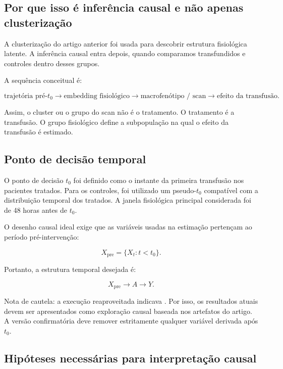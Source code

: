 \subsection{Por que isso é inferência causal e não apenas clusterização}

A clusterização do artigo anterior foi usada para descobrir estrutura fisiológica latente. A inferência causal entra depois, quando comparamos transfundidos e controles dentro desses grupos.

A sequência conceitual é:

\[
\text{trajetória pré-}t_0
\rightarrow
\text{embedding fisiológico}
\rightarrow
\text{macrofenótipo / scan}
\rightarrow
\text{efeito da transfusão}.
\]

Assim, o cluster ou o grupo do scan não é o tratamento. O tratamento é a transfusão. O grupo fisiológico define a subpopulação na qual o efeito da transfusão é estimado.

\subsection{Ponto de decisão temporal}

O ponto de decisão $t_0$ foi definido como o instante da primeira transfusão nos pacientes tratados. Para os controles, foi utilizado um pseudo-$t_0$ compatível com a distribuição temporal dos tratados. A janela fisiológica principal considerada foi de 48 horas antes de $t_0$.

O desenho causal ideal exige que as variáveis usadas na estimação pertençam ao período pré-intervenção:

\[
X_{\text{pre}} = \{X_t: t < t_0\}.
\]

Portanto, a estrutura temporal desejada é:

\[
X_{\text{pre}} \longrightarrow A \longrightarrow Y.
\]

\begin{boxsummary}
Nota de cautela: a execução reaproveitada indicava . Por isso, os resultados atuais devem ser apresentados como exploração causal baseada nos artefatos do artigo. A versão confirmatória deve remover estritamente qualquer variável derivada após $t_0$.
\end{boxsummary}

\subsection{Hipóteses necessárias para interpretação causal}

